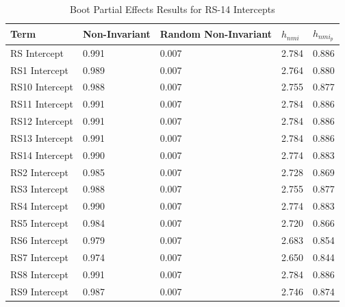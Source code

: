 \documentclass[
  man]{apa7}
\begin{document}
\normalsize

\begin{table}[tbp]

\begin{center}
\begin{threeparttable}

\caption{\label{tab:table-boot-effects}Boot Partial Effects Results for RS-14 Intercepts}

\begin{tabular}{lllll}
\toprule
Term & Non-Invariant & Random Non-Invariant & $h_{nmi}$ & $h_{nmi_p}$\\
\midrule
RS  Intercept & 0.991 & 0.007 & 2.784 & 0.886\\
RS1  Intercept & 0.989 & 0.007 & 2.764 & 0.880\\
RS10  Intercept & 0.988 & 0.007 & 2.755 & 0.877\\
RS11  Intercept & 0.991 & 0.007 & 2.784 & 0.886\\
RS12  Intercept & 0.991 & 0.007 & 2.784 & 0.886\\
RS13  Intercept & 0.991 & 0.007 & 2.784 & 0.886\\
RS14  Intercept & 0.990 & 0.007 & 2.774 & 0.883\\
RS2  Intercept & 0.985 & 0.007 & 2.728 & 0.869\\
RS3  Intercept & 0.988 & 0.007 & 2.755 & 0.877\\
RS4  Intercept & 0.990 & 0.007 & 2.774 & 0.883\\
RS5  Intercept & 0.984 & 0.007 & 2.720 & 0.866\\
RS6  Intercept & 0.979 & 0.007 & 2.683 & 0.854\\
RS7  Intercept & 0.974 & 0.007 & 2.650 & 0.844\\
RS8  Intercept & 0.991 & 0.007 & 2.784 & 0.886\\
RS9  Intercept & 0.987 & 0.007 & 2.746 & 0.874\\
\bottomrule
\end{tabular}

\end{threeparttable}
\end{center}

\end{table}
\end{document}
